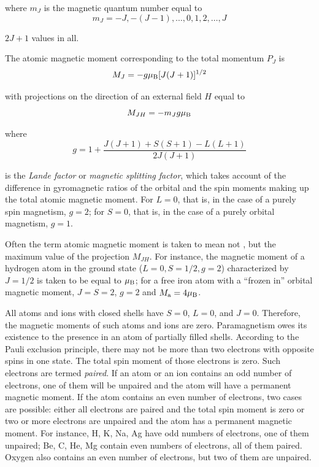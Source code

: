 \noindent
where $m_J$ is the magnetic quantum number equal to
\begin{equation}\label{eq:7_32}
    m_J = -J, -(J-1), \ldots, 0, 1, 2, \ldots, J
\end{equation}

\noindent
$2J+1$ values in all.

The atomic magnetic moment corresponding to the total momentum $P_J$ is
\begin{equation}\label{eq:7_33}
    M_J = - g \mu_{\text{B}} [J (J + 1)]^{1/2}
\end{equation}

\noindent
with projections on the direction of an external field $H$ equal to
\begin{equation}\label{eq:7_34}
    M_{JH} = - m_J g \mu_{\text{B}}
\end{equation}

\noindent
where
\begin{equation}\label{eq:7_35}
    g = 1 + \frac{J(J+1) + S(S+1) - L(L+1)}{2J(J+1)}
\end{equation}

\noindent
is the \textit{Lande factor} or \textit{magnetic splitting factor}, which takes account of the difference in gyromagnetic ratios of the orbital and the spin moments making up the total atomic magnetic moment. For $L=0$, that is, in the case of a purely spin magnetism, $g=2$; for $S=0$, that is, in the case of a purely orbital magnetism, $g=1$.

Often the term atomic magnetic moment is taken to mean not , but the maximum value of the projection $M_{JH}$. For instance, the magnetic moment of a hydrogen atom in the ground state ($L=0, S=1/2, g=2$) characterized by $J=1/2$ is taken to be equal to $\mu_{\text{B}}$; for a free iron atom with a ``frozen in'' orbital magnetic moment, $J=S=2$, $g=2$ and $M_{\text{a}}= 4\mu_{\text{B}}$.

All atoms and ions with closed shells have $S=0$, $L=0$, and $J=0$. Therefore, the magnetic moments of such atoms and ions are zero. Paramagnetism owes its existence to the presence in an atom of partially filled shells. According to the Pauli exclusion principle, there may not be more than two electrons with opposite spins in one state. The total spin moment of those electrons is zero. Such electrons are termed \textit{paired}. If an atom or an ion contains an odd number of electrons, one of them will be unpaired and the atom will have a permanent magnetic moment. If the atom contains an even number
of electrons, two cases are possible: either all electrons are paired and the total spin moment is zero or two or more electrons are unpaired and the atom has a permanent magnetic moment. For instance, H, K, Na, Ag have odd numbers of electrons, one of them unpaired; Be, C, He, Mg contain even numbers of electrons, all of them paired. Oxygen also contains an even number of electrons, but two of them are unpaired.

